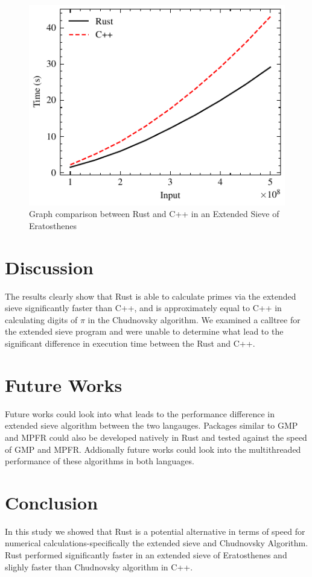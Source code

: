 \documentclass[10pt]{IEEEtran}
\begin{document}
\begin{figure}[h]
    \centering
    \includegraphics{sieveplot}
    \caption{\label{sieve-graph}Graph comparison between Rust and C++ in an Extended Sieve of Eratosthenes}
\end{figure}
\section{Discussion}
The results clearly show that Rust is able to calculate primes via the extended sieve significantly faster than C++, and is approximately equal to C++ in calculating digits of $\pi$ in the Chudnovsky algorithm.
We examined a calltree for the extended sieve program and were unable to determine what lead to the significant difference in execution time between the Rust and C++.
\section{Future Works}
Future works could look into what leads to the performance difference in extended sieve algorithm between the two langauges. Packages similar to GMP and MPFR could also be developed natively in Rust and tested against the speed of GMP and MPFR.\@
Addionally future works could look into the multithreaded performance of these algorithms in both languages.
\section{Conclusion}
In this study we showed that Rust is a potential alternative in terms of speed for numerical calculations-specifically the extended sieve and Chudnovsky Algorithm.
Rust performed significantly faster in an extended sieve of Eratosthenes and slighly faster than Chudnovsky algorithm in C++.
\nocite{*}


\end{document}
